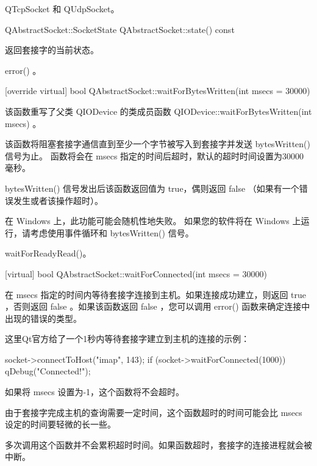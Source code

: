 \begin{seeAlso}
QTcpSocket 和 QUdpSocket。
\end{seeAlso}



QAbstractSocket::SocketState QAbstractSocket::state() const

返回套接字的当前状态。


\begin{seeAlso}
error() 。
\end{seeAlso}

[override virtual] bool QAbstractSocket::waitForBytesWritten(int msecs
= 30000)

该函数重写了父类 QIODevice 的类成员函数 QIODevice::waitForBytesWritten(int msecs) 。

该函数将阻塞套接字通信直到至少一个字节被写入到套接字并发送 bytesWritten() 信号为止。 函数将会在 msecs 指定的时间后超时，默认的超时时间设置为30000毫秒。

bytesWritten() 信号发出后该函数返回值为 true，偶则返回 false （如果有一个错误发生或者该操作超时）。

\begin{notice}
在 Windows 上，此功能可能会随机性地失败。 如果您的软件将在 Windows 上运行，请考虑使用事件循环和 bytesWritten() 信号。
\end{notice}

\begin{seeAlso}
waitForReadyRead()。
\end{seeAlso}

[virtual] bool QAbstractSocket::waitForConnected(int msecs = 30000)

在 msecs 指定的时间内等待套接字连接到主机。如果连接成功建立，则返回 true ，否则返回 false 。如果该函数返回 false ，您可以调用 error() 函数来确定连接中出现的错误的类型。

这里Qt官方给了一个1秒内等待套接字建立到主机的连接的示例：


\begin{cppcode}
socket->connectToHost("imap", 143);
if (socket->waitForConnected(1000))
	qDebug("Connected!");
\end{cppcode}

如果将 msecs 设置为-1，这个函数将不会超时。

\begin{notice}
由于套接字完成主机的查询需要一定时间，这个函数超时的时间可能会比 msecs 设定的时间要轻微的长一些。
\end{notice}


\begin{notice}
多次调用这个函数并不会累积超时时间。如果函数超时，套接字的连接进程就会被中断。
\end{notice}

